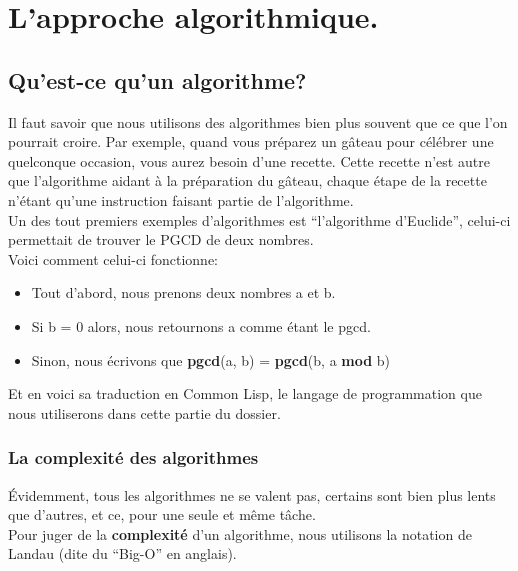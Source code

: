 \documentclass[a4paper, 12pt]{article}
\numberwithin{equation}{subsection}
\begin{document}
\newpage
\section{L'approche algorithmique.}
\subsection{Qu'est-ce qu'un algorithme?}
\begin{center}
\end{center}

Il faut savoir que nous utilisons des algorithmes bien plus souvent que ce que l'on pourrait croire. Par exemple, quand vous préparez un gâteau pour célébrer une quelconque occasion, vous aurez besoin d'une recette. Cette recette n'est autre que l'algorithme aidant à la préparation du gâteau, chaque étape de la recette n'étant qu'une instruction faisant partie de l'algorithme. \\

Un des tout premiers exemples d'algorithmes est ``l'algorithme d'Euclide'', celui-ci permettait de trouver le PGCD de deux nombres.\\
Voici comment celui-ci fonctionne: \\[0.2cm]
\begin{itemize}
  \item Tout d'abord, nous prenons deux nombres a et b.
  \item Si b = 0 alors, nous retournons a comme étant le pgcd.
  \item Sinon, nous écrivons que {\bf pgcd}(a, b) = {\bf pgcd}(b, a {\bf mod} b)\\[0.2cm]
\end{itemize}
Et en voici sa traduction en Common Lisp, le langage de programmation que nous utiliserons dans cette partie du dossier.


\subsubsection{La complexité des algorithmes}
Évidemment, tous les algorithmes ne se valent pas, certains sont bien plus lents que d'autres, et ce, pour une seule et même tâche.\\
Pour juger de la {\bf complexité} d'un algorithme, nous utilisons la notation de Landau (dite du ``Big-O'' en anglais). \\
\end{document}
